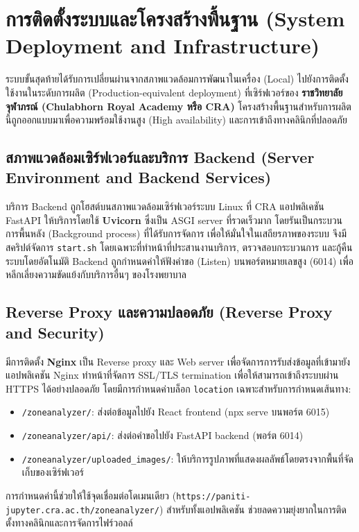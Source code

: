 \section{การติดตั้งระบบและโครงสร้างพื้นฐาน (System Deployment and Infrastructure)}

ระบบขั้นสุดท้ายได้รับการเปลี่ยนผ่านจากสภาพแวดล้อมการพัฒนาในเครื่อง (Local) ไปยังการติดตั้งใช้งานในระดับการผลิต (Production-equivalent deployment) ที่เซิร์ฟเวอร์ของ \textbf{ราชวิทยาลัยจุฬาภรณ์ (Chulabhorn Royal Academy หรือ CRA)} โครงสร้างพื้นฐานสำหรับการผลิตนี้ถูกออกแบบมาเพื่อความพร้อมใช้งานสูง (High availability) และการเข้าถึงทางคลินิกที่ปลอดภัย

\subsection{สภาพแวดล้อมเซิร์ฟเวอร์และบริการ Backend (Server Environment and Backend Services)}

บริการ Backend ถูกโฮสต์บนสภาพแวดล้อมเซิร์ฟเวอร์ระบบ Linux ที่ CRA แอปพลิเคชัน FastAPI ให้บริการโดยใช้ \textbf{Uvicorn} ซึ่งเป็น ASGI server ที่รวดเร็วมาก โดยรันเป็นกระบวนการพื้นหลัง (Background process) ที่ได้รับการจัดการ เพื่อให้มั่นใจในเสถียรภาพของระบบ จึงมีสคริปต์จัดการ \texttt{start.sh} โดยเฉพาะที่ทำหน้าที่ประสานงานบริการ, ตรวจสอบกระบวนการ และกู้คืนระบบโดยอัตโนมัติ Backend ถูกกำหนดค่าให้ฟังคำขอ (Listen) บนพอร์ตหมายเลขสูง (6014) เพื่อหลีกเลี่ยงความขัดแย้งกับบริการอื่นๆ ของโรงพยาบาล

\subsection{Reverse Proxy และความปลอดภัย (Reverse Proxy and Security)}

มีการติดตั้ง \textbf{Nginx} เป็น Reverse proxy และ Web server เพื่อจัดการการรับส่งข้อมูลที่เข้ามายังแอปพลิเคชัน Nginx ทำหน้าที่จัดการ SSL/TLS termination เพื่อให้สามารถเข้าถึงระบบผ่าน HTTPS ได้อย่างปลอดภัย โดยมีการกำหนดค่าบล็อก \texttt{location} เฉพาะสำหรับการกำหนดเส้นทาง:
\begin{itemize}
    \item \texttt{/zoneanalyzer/}: ส่งต่อข้อมูลไปยัง React frontend (npx serve บนพอร์ต 6015)
    \item \texttt{/zoneanalyzer/api/}: ส่งต่อคำขอไปยัง FastAPI backend (พอร์ต 6014)
    \item \texttt{/zoneanalyzer/uploaded_images/}: ให้บริการรูปภาพที่แสดงผลลัพธ์โดยตรงจากพื้นที่จัดเก็บของเซิร์ฟเวอร์
\end{itemize}
การกำหนดค่านี้ช่วยให้ใช้จุดเชื่อมต่อโดเมนเดียว (\texttt{https://paniti-jupyter.cra.ac.th/zoneanalyzer/}) สำหรับทั้งแอปพลิเคชัน ช่วยลดความยุ่งยากในการติดตั้งทางคลินิกและการจัดการไฟร์วอลล์

